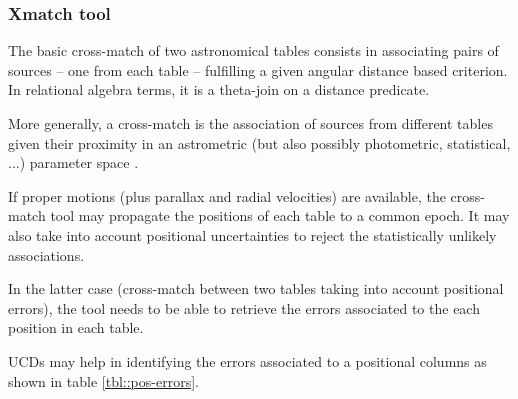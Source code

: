 \documentclass[11pt,a4paper]{ivoa}
\begin{document}
\subsubsection{Xmatch tool }

The basic cross-match of two astronomical tables consists in associating pairs of sources -- one from each table -- fulfilling a given angular distance based criterion.
In relational algebra terms, it is a theta-join on a distance predicate.

More generally, a cross-match is the association of sources from different tables given their proximity in an astrometric (but also possibly photometric, statistical, ...) parameter space \citep{2017A&A...597A..89P} .

If proper motions (plus parallax and radial velocities) are available, the cross-match tool may propagate the positions of each table to a common epoch.
It may also take into account positional uncertainties to reject the statistically unlikely associations.

In the latter case (cross-match between two tables taking into account positional errors), the tool needs to be able to retrieve the errors associated to the each position in each table.

UCDs may help in identifying the errors associated to a positional columns as shown in table \ref{tbl::pos-errors}.
\end{document}
